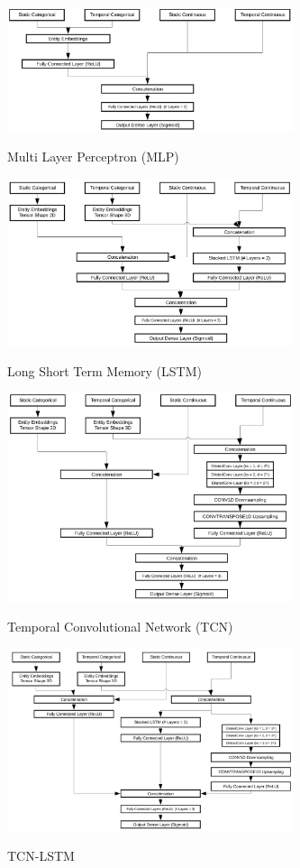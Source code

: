   \begin{figure}[t]
    \centering 
    \caption{Multi Layer Perceptron (MLP)} 
    \includegraphics[width=3.3in]{img/MLP.png} 
    \label{fig:MLP} 
  \end{figure}
  \begin{figure}[t]
    \centering 
    \caption{Long Short Term Memory (LSTM)} 
    \includegraphics[width=3.3in]{img/LSTM.png} 
    \label{fig:LSTM} 
  \end{figure}
  \begin{figure}[t]
    \centering 
    \caption{Temporal Convolutional Network (TCN)} 
    \includegraphics[width=3.3in]{img/TCN.png} 
    \label{fig:TCN} 
  \end{figure}
  \begin{figure}[t]
    \centering 
    \caption{TCN-LSTM} 
    \includegraphics[width=3.3in]{img/TCNLSTM.png} 
    \label{fig:TCNLSTM} 
  \end{figure}
